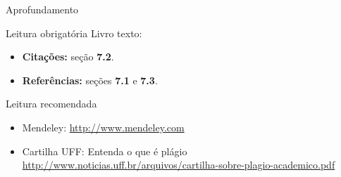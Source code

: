 \documentclass{beamer}
\begin{document}
\begin{frame}{Aprofundamento}
  \begin{block}{Leitura obrigatória}
    Livro texto:
    \begin{itemize}
      \scriptsize
    \item {\bf Citações:} seção {\bf 7.2}.
    \item {\bf Referências:} seções {\bf 7.1} e {\bf 7.3}.
    \end{itemize}
  \end{block}
  \begin{block}{Leitura recomendada}
    \begin{itemize}
      \scriptsize
    \item Mendeley: {\tiny \url{http://www.mendeley.com}}
    \item Cartilha UFF: Entenda o que é plágio {\tiny \url{http://www.noticias.uff.br/arquivos/cartilha-sobre-plagio-academico.pdf}}
    \end{itemize}
  \end{block}
\end{frame}
\end{document}
